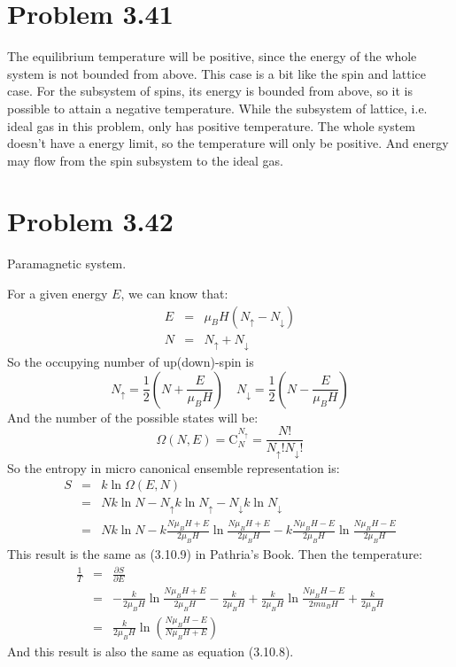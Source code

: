 \documentclass{article}
\begin{document}
\section*{Problem 3.41}
	The equilibrium temperature will be positive, since the energy of the whole system is not bounded from above. This case is a bit like the spin and lattice case. For the subsystem of spins, its energy is bounded from above, so it is possible to attain a negative temperature. While the subsystem of lattice, i.e. ideal gas in this problem, only has positive temperature. The whole system doesn't have a energy limit, so the temperature will only be positive. And energy may flow from the spin subsystem to the ideal gas.

\section*{Problem 3.42}
	Paramagnetic system.

	For a given energy $E$, we can know that:
	\begin{eqnarray}
	E &=& \mu_B H (N_{\uparrow}-N_\downarrow)\\
	N &=& N_\uparrow + N_\downarrow
	\end{eqnarray}
	So the occupying number of up(down)-spin is
	$$
	N_\uparrow = \frac{1}{2}\left(N+\frac{E}{\mu_B H}\right)\quad N_\downarrow = \frac{1}{2}\left(N-\frac{E}{\mu_B H}\right)
	$$
	And the number of the possible states will be:
	\begin{equation}
	\Omega(N,E) = \mathrm{C}_{N}^{N_\uparrow}=\frac{N!}{N_\uparrow !N_\downarrow!}
	\end{equation}
	So the entropy in micro canonical ensemble representation is:
	\begin{eqnarray}
	S &=& k\ln\Omega(E,N) \nonumber\\
	&=& Nk\ln N -N_\uparrow k \ln N_\uparrow - N_\downarrow k \ln N_\downarrow\nonumber\\
	&=& Nk\ln N -k\frac{N\mu_B H +E}{2\mu_B H}\ln \frac{N\mu_B H +E}{2\mu_B H}-k\frac{N\mu_B H -E}{2\mu_B H}\ln\frac{N\mu_B H -E}{2\mu_B H}
	\end{eqnarray}
	This result is the same as (3.10.9) in Pathria's Book. Then the temperature:
	\begin{eqnarray}
	\frac{1}{T} &=& \frac{\partial S}{\partial E}\nonumber\\
	&=&-\frac{k}{2\mu_B H}\ln \frac{N\mu_B H +E}{2\mu_B H}-\frac{k}{2\mu_B H}+\frac{k}{2\mu_BH}\ln\frac{N\mu_B H-E}{2
	mu_B H}+\frac{k}{2\mu_BH}\nonumber\\
	&=&\frac{k}{2\mu_BH}\ln\left(\frac{N\mu_BH-E}{N\mu_BH+E}\right)
	\end{eqnarray}
	And this result is also the same as equation (3.10.8).
\end{document}
